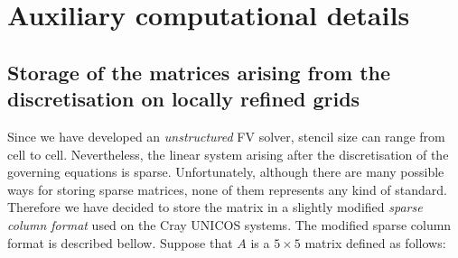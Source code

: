\documentclass[10pt]{article}
\begin{document}
         
%
    \newpage
    \section{Auxiliary computational details}
%

    \subsection{Storage of the matrices arising from the
                discretisation on locally refined grids}

    Since we have developed an {\em unstructured} FV solver, stencil
    size can range from cell to cell. Nevertheless, the linear system
    arising after the discretisation of the governing equations is
    sparse. Unfortunately, although there are many possible ways for
    storing sparse matrices, none of them represents any kind of
    standard. Therefore we have decided to store
    the matrix in a slightly modified {\em sparse column format} used
    on the Cray UNICOS systems. 
    The modified sparse column format is described bellow.
    Suppose that $A$ is a $5 \times 5$ matrix defined as follows:
\end{document}
